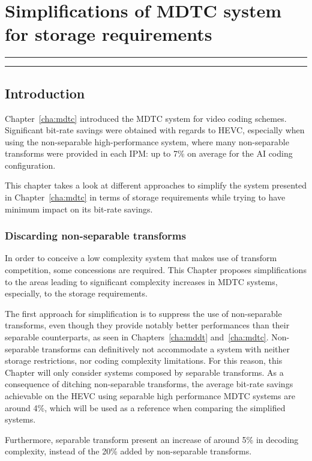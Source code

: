 \documentclass[11pt,a4paper,openright,twoside]{book}
\providecommand{\chaptertoc}{
	\startcontents[chapters]
	\hrule
	\vspace{1em}
	\printcontents[chapters]{}{1}{{\sf\large\bfseries Contents}}
	\vspace{1em}
	\hrule
}
\numberwithin{equation}{section} %
\numberwithin{figure}{section} %
\numberwithin{table}{section} %
\begin{document}
\chapter{Simplifications of \acs{MDTC} system for storage requirements}
\label{cha:real_world_system}
\chaptertoc

\section{Introduction}
\label{sec:rw_introduction}

Chapter~\ref{cha:mdtc} introduced the \acf{MDTC} system for video coding
schemes.
Significant bit-rate savings were obtained with regards to \ac{HEVC},
especially when using the non-separable high-performance system, where many
non-separable transforms were provided in each \acf{IPM}:
up to 7\% on average for the \ac{AI} coding configuration.

This chapter takes a look at different approaches to simplify the
system presented in Chapter~\ref{cha:mdtc} in terms of storage requirements
while trying to have minimum impact on its bit-rate savings.

\subsection{Discarding non-separable transforms}
\label{sub:discarding_non_separable_transforms}

In order to conceive a low complexity system that makes use of transform
competition, some concessions are required.
This Chapter proposes simplifications to the areas leading to significant
complexity increases in \ac{MDTC} systems, especially, to the storage
requirements.

The first approach for simplification is to suppress the use of non-separable
transforms, even though they provide notably better performances than their
separable counterparts, as seen in Chapters~\ref{cha:mddt} and~\ref{cha:mdtc}.
Non-separable transforms can definitively not accommodate a system with
neither storage restrictions, nor coding complexity limitations.
For this reason, this Chapter will only consider systems composed by separable
transforms.
As a consequence of ditching non-separable transforms, the average bit-rate
savings achievable on the \ac{HEVC} using separable high performance \ac{MDTC}
systems are around 4\%, which will be used as a reference when comparing the
simplified systems.

Furthermore, separable transform present an increase of around 5\% in decoding
complexity, instead of the 20\% added by non-separable transforms.
\end{document}
